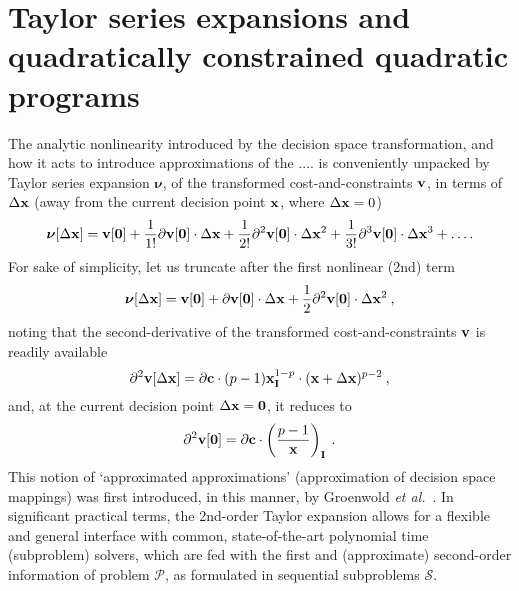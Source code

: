 \documentclass[11pt]{article}
\begin{document}

\section{Taylor series expansions and quadratically constrained quadratic programs}

The analytic nonlinearity introduced by the decision space transformation, and how it acts to introduce approximations of the ....  is conveniently unpacked by Taylor series expansion $\bm{\nu}$, of the transformed cost-and-constraints $\mathbf{v}$, in terms of $\Delta \mathbf{x}$ (away from the current decision point $\mathbf{x}$, where $\Delta \mathbf{x}=0$)
\begin{equation}
\bm{\nu}[\Delta \mathbf{x}] = \mathbf{v}[\mathbf{0}] + \frac{1}{1!}\partial \mathbf{v}[\mathbf{0}] \cdot  \Delta \mathbf{x} + \frac{1}{2!}\partial^2 \mathbf{v} [\mathbf{0}] \cdot \Delta \mathbf{x}^2 + \frac{1}{3!}\partial^3 \mathbf{v}[\mathbf{0}] \cdot \Delta \mathbf{x}^3 + \ldots .
\end{equation}
For sake of simplicity, let us truncate after the first nonlinear (2nd) term
\begin{equation}
\bm{\nu}[\Delta \mathbf{x}] = \mathbf{v}[\mathbf{0}] + \partial \mathbf{v}[\mathbf{0}] \cdot \Delta \mathbf{x} + \frac{1}{2}\partial^2 \mathbf{v}[\mathbf{0}] \cdot  \Delta \mathbf{x}^2 \: , 
\end{equation}
noting that the second-derivative of the transformed cost-and-constraints $\mathbf{v}$ is readily available
\begin{equation}
\partial^2 \mathbf{v}[\Delta \mathbf{x}] = \partial \mathbf{c} \cdot (p-1)\mathbf{x}_{\mathbf{I}}^{1-p} \cdot (\mathbf{x}+\Delta\mathbf{x})^{p-2} \: ,
\end{equation}
and, at the current decision point $\Delta \mathbf{x} = \mathbf{0}$, it reduces to
\begin{equation}
\partial^2 \mathbf{v}[\mathbf{0}] = \partial \mathbf{c} \cdot \left(\frac{p-1}{\mathbf{x}}\right)_{\mathbf{I}} \: .
\end{equation}
This notion of `approximated approximations' (approximation of decision space mappings) was first introduced, in this manner, by Groenwold \emph{et al.}~\cite{groenwold2010approximated}. In significant practical terms, the 2nd-order Taylor expansion allows for a flexible and general interface with common, state-of-the-art polynomial time (subproblem) solvers, which are fed with the first and (approximate) second-order information of problem $\mathcal{P}$, as formulated in sequential subproblems $\mathcal{S}$. %
\end{document}
